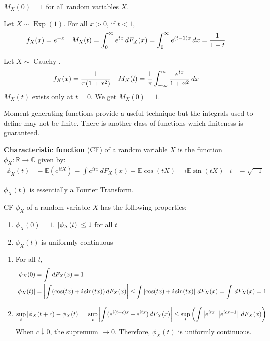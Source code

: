 \documentclass{huhtakm-template-book}
\newcommand{\expect}{\mathbb{E}}
\DeclareMathOperator{\Exp}{Exp}
\DeclareMathOperator{\Cauchy}{Cauchy}
\begin{document}
\begin{rem}
    $M_{X}(0)=1$ for all random variables $X$.
\end{rem}
\begin{eg}
    Let $X\sim\Exp(1)$. For all $x>0$, if $t<1$,
    \begin{align*}
        f_{X}(x)&=e^{-x} & M_{X}(t)&=\int_{0}^{\infty}e^{tx}\,dF_{X}(x)=\int_{0}^{\infty}e^{(t-1)x}\,dx=\frac{1}{1-t}
    \end{align*}
\end{eg}
\begin{eg}
    Let $X\sim\Cauchy$.
    \begin{align*}
        f_{X}(x)&=\frac{1}{\pi(1+x^{2})} & M_{X}(t)&=\frac{1}{\pi}\int_{-\infty}^{\infty}\frac{e^{tx}}{1+x^{2}}\,dx
    \end{align*}
    $M_{X}(t)$ exists only at $t=0$. We get $M_{X}(0)=1$.
\end{eg}
\newpage
Moment generating functions provide a useful technique but the integrals used to define may not be finite. There is another class of functions which finiteness is guaranteed.
\begin{defn}
    \textbf{Characteristic function} (CF) of a random variable $X$ is the function $\phi_{X}:\mathbb{R}\to\mathbb{C}$ given by:
    \begin{align*}
        \phi_{X}(t)&=\expect(e^{itX})=\int e^{itx}\,dF_{X}(x)=\expect\cos(tX)+i\expect\sin(tX) & i&=\sqrt{-1}
    \end{align*}
\end{defn}
\begin{rem}
    $\phi_{X}(t)$ is essentially a Fourier Transform.
\end{rem}
\begin{lem}
    CF $\phi_{X}$ of a random variable $X$ has the following properties:
    \begin{enumerate}
        \item $\phi_{X}(0)=1$. $\left|{\phi_{X}(t)}\right|\leq 1$ for all $t$
        \item $\phi_{X}(t)$ is uniformly continuous
    \end{enumerate}
\end{lem}
\begin{proofing}
    \begin{enumerate}
        \item For all $t$,
        \begin{align*}
            \phi_{X}(0)&=\int\,dF_{X}(x)=1\\
            \left|{\phi_{X}(t)}\right|&=\left|{\int(\cos(tx)+i\sin(tx))\,dF_{X}(x)}\right|\leq\int\left|{\cos(tx)+i\sin(tx)}\right|\,dF_{X}(x)=\int\,dF_{X}(x)=1
        \end{align*}
        \item
        \begin{equation*}
            \sup_{t}\left|{\phi_{X}(t+c)-\phi_{X}(t)}\right|=\sup_{t}\left|{\int(e^{i(t+c)x}-e^{itx})\,dF_{X}(x)}\right|\leq\sup_{t}\left(\int\left|{e^{itx}}\right|\left|{e^{icx-1}}\right|\,dF_{X}(x)\right)
        \end{equation*}
        When $c\downarrow 0$, the supremum $\to 0$. Therefore, $\phi_{X}(t)$ is uniformly continuous.
    \end{enumerate}
\end{proofing}
\end{document}
